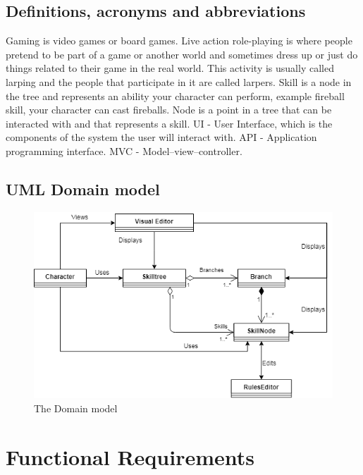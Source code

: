 \documentclass[12pt]{article}
\begin{document}
  \subsection{Definitions, acronyms and abbreviations}
  Gaming is video games or board games.\newline
  Live action role-playing is where people pretend to be part of a game or another world and sometimes dress up or just do things related to their game in the real world. This activity is usually called larping and the people that participate in it are called larpers.\newline
  Skill is a node in the tree and represents an ability your character can perform, example fireball skill, your character can cast fireballs.\newline
  Node is a point in a tree that can be interacted with and that represents a skill.\newline
  UI - User Interface, which is the components of the system the user will interact with.\newline
  API - Application programming interface.\newline
  MVC - Model–view–controller.\newline
  \subsection{UML Domain model}
  
\begin{figure}[H]
  \includegraphics[width=\linewidth]{images/TriiDomainModel.png}
  \caption{The Domain model}
  \label{fig:Domainmodel}
\end{figure}
  
\section{Functional Requirements}
\end{document}
